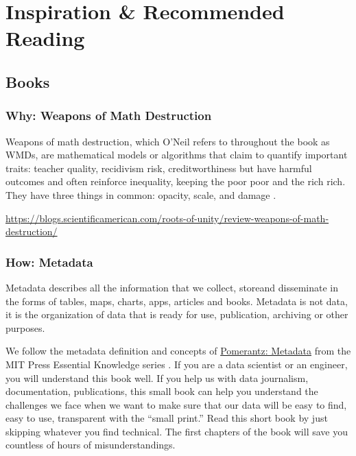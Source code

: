 \documentclass[
  fontsize=13pt,
  english,
  a4paper,
  openany, a4paper, oneside]{book}
\begin{document}
\hypertarget{inspiration}{%
\section{Inspiration \& Recommended Reading}\label{inspiration}}

\hypertarget{books}{%
\subsection{Books}\label{books}}

\hypertarget{why-weapons-of-math-destruction}{%
\subsubsection{Why: Weapons of Math Destruction}\label{why-weapons-of-math-destruction}}

Weapons of math destruction, which O'Neil refers to throughout the book as WMDs, are mathematical models or algorithms that claim to quantify important traits: teacher quality, recidivism risk, creditworthiness but have harmful outcomes and often reinforce inequality, keeping the poor poor and the rich rich. They have three things in common: opacity, scale, and damage \citep{weapons_of_math_destruction}.

\url{https://blogs.scientificamerican.com/roots-of-unity/review-weapons-of-math-destruction/}

\hypertarget{how-metadata}{%
\subsubsection{How: Metadata}\label{how-metadata}}

Metadata describes all the information that we collect, storeand disseminate in the forms of tables, maps, charts, apps, articles and books. Metadata is not data, it is the organization of data that is ready for use, publication, archiving or other purposes.

We follow the metadata definition and concepts of \href{https://mitpress.mit.edu/books/metadata}{Pomerantz: Metadata} from the MIT Press Essential Knowledge series \citep{pomerantz_2015}. If you are a data scientist or an engineer, you will understand this book well. If you help us with data journalism, documentation, publications, this small book can help you understand the challenges we face when we want to make sure that our data will be easy to find, easy to use, transparent with the ``small print.'' Read this short book by just skipping whatever you find technical. The first chapters of the book will save you countless of hours of misunderstandings.
\end{document}

